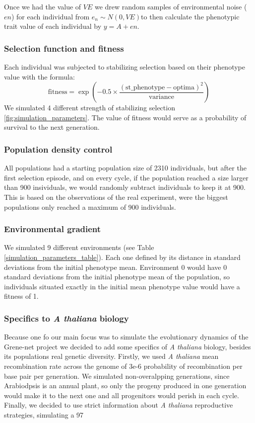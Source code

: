 \documentclass{article}
\begin{document}
Once we had the value of \( VE \) we drew random samples of environmental noise (\( en \)) for each individual from \( e_n \sim N(0, VE) \)to then calculate the phenotypic trait value of each individual by \( y = A + en \).

\subsubsection{Selection function and fitness}
Each individual was subjected to stabilizing selection based on their phenotype value with the formula:
\[
\text{fitness} = \exp\left(-0.5 \times \frac{(\text{st\_phenotype} - \text{optima})^2}{\text{variance}}\right)
\]
We simulated 4 different strength of stabilizing selection \ref{fig:simulation_parameters}. The value of fitness would serve as a probability of survival to the next generation. 

\subsubsection{Population density control}
All populations had a starting population size of 2310 individuals, but after the first selection episode, and on every cycle, if the population reached a size larger than 900 insividuals, we would randomly subtract individuals to keep it at 900. This is based on the observations of the real experiment, were the biggest populations only reached a maximum of 900 individuals. 

\subsubsection{Environmental gradient}
We simulated 9 different environments (see Table \ref{simulation_parameters_table}). Each one defined by its distance in standard deviations from the initial phenotype mean. Environment 0 would have 0 standard deviations from the initial phenotype mean of the population, so individuals situated exactly in the initial mean phenotype value would have a fitness of 1. 

\subsubsection{Specifics to \textit{A thaliana} biology}
Because one fo our main focus was to simulate the evolutionary dynamics of the Grene-net project we decided to add some specifics of \textit{A thaliana} biology, besides its populations real genetic diversity. Firstly, we used \textit{A thaliana} mean recombination rate across the genome of 3e-6 probability of recombination per base pair per generation. We simulated non-overalpping generations, since Arabiodpsis is an annual plant, so only the progeny produced in one generation would make it to the next one and all progenitors would perish in each cycle. Finally, we decided to use strict information about \textit{A thaliana} reproductive strategies, simulating a 97%
\end{document}
